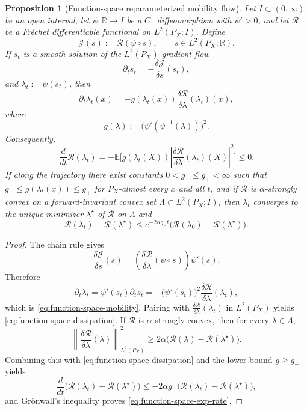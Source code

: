 \documentclass[11pt]{article}
\newtheorem{proposition}[theorem]{Proposition}
\theoremstyle{definition}
\newcommand{\R}{\mathbb{R}}
\newcommand{\E}{\mathbb{E}}
\newcommand{\mc}[1]{\mathcal{#1}}
\begin{document}
\begin{proposition}[Function-space reparameterized mobility flow]
\label{prop:function-space-mobility}
Let $I\subset (0,\infty)$ be an open interval, let $\psi:\R\to I$ be a $C^1$
diffeomorphism with $\psi'>0$, and let $\mc{R}$ be a Fr\'echet differentiable
functional on $L^2(P_X;I)$. Define
\[
  \mc{J}(s) := \mc{R}(\psi\circ s),
  \qquad s\in L^2(P_X;\R).
\]
If $s_t$ is a smooth solution of the $L^2(P_X)$ gradient flow
\[
  \partial_t s_t = -\frac{\delta \mc{J}}{\delta s}(s_t),
\]
and $\lambda_t:=\psi(s_t)$, then
\begin{equation}
  \partial_t \lambda_t(x)
  =
  -g(\lambda_t(x))
  \frac{\delta \mc{R}}{\delta \lambda}(\lambda_t)(x),
  \label{eq:function-space-mobility}
\end{equation}
where
\[
  g(\lambda)
  :=
  \big(\psi'(\psi^{-1}(\lambda))\big)^2.
\]
Consequently,
\begin{equation}
  \frac{d}{dt}\mc{R}(\lambda_t)
  =
  -
  \E\Bigg[
    g(\lambda_t(X))
    \left|
      \frac{\delta \mc{R}}{\delta \lambda}(\lambda_t)(X)
    \right|^2
  \Bigg]
  \le 0.
  \label{eq:function-space-dissipation}
\end{equation}
If along the trajectory there exist constants $0<g_-\le g_+<\infty$ such that
$g_- \le g(\lambda_t(x))\le g_+$ for $P_X$-almost every $x$ and all $t$, and if
$\mc{R}$ is $\alpha$-strongly convex on a forward-invariant convex set
$\Lambda\subset L^2(P_X;I)$, then $\lambda_t$ converges to the unique minimizer
$\lambda^\star$ of $\mc{R}$ on $\Lambda$ and
\begin{equation}
  \mc{R}(\lambda_t)-\mc{R}(\lambda^\star)
  \le
  e^{-2\alpha g_- t}
  \big(\mc{R}(\lambda_0)-\mc{R}(\lambda^\star)\big).
  \label{eq:function-space-exp-rate}
\end{equation}
\end{proposition}

\begin{proof}
The chain rule gives
\[
  \frac{\delta \mc{J}}{\delta s}(s)
  =
  \left(
    \frac{\delta \mc{R}}{\delta \lambda}(\psi\circ s)
  \right)\psi'(s).
\]
Therefore
\[
  \partial_t \lambda_t
  =
  \psi'(s_t)\partial_t s_t
  =
  -
  \big(\psi'(s_t)\big)^2
  \frac{\delta \mc{R}}{\delta \lambda}(\lambda_t),
\]
which is \eqref{eq:function-space-mobility}. Pairing with
$\frac{\delta \mc{R}}{\delta \lambda}(\lambda_t)$ in $L^2(P_X)$ yields
\eqref{eq:function-space-dissipation}. If $\mc{R}$ is $\alpha$-strongly convex,
then for every $\lambda\in\Lambda$,
\[
  \left\|
    \frac{\delta \mc{R}}{\delta \lambda}(\lambda)
  \right\|_{L^2(P_X)}^2
  \ge
  2\alpha\big(\mc{R}(\lambda)-\mc{R}(\lambda^\star)\big).
\]
Combining this with \eqref{eq:function-space-dissipation} and the lower bound
$g\ge g_-$ yields
\[
  \frac{d}{dt}\big(\mc{R}(\lambda_t)-\mc{R}(\lambda^\star)\big)
  \le
  -2\alpha g_-
  \big(\mc{R}(\lambda_t)-\mc{R}(\lambda^\star)\big),
\]
and Gr\"onwall's inequality proves \eqref{eq:function-space-exp-rate}.
\end{proof}
\end{document}
